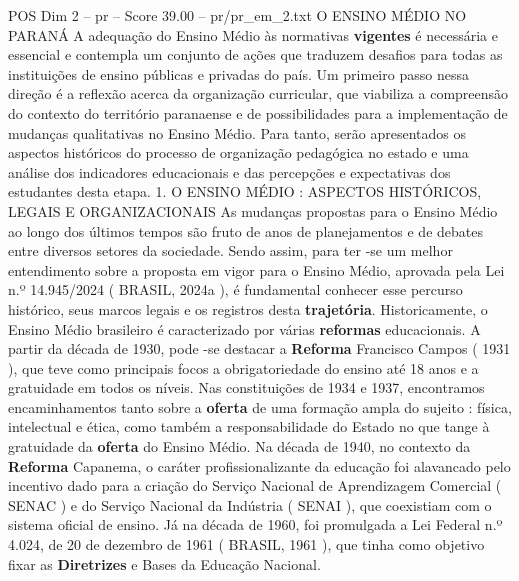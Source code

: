 \begin{textsample}{POS Dim 2 – pr – Score 39.00 – pr/pr\_em\_2.txt}  \label{ex:f2_pos_112}
O ENSINO MÉDIO NO PARANÁ A adequação do Ensino Médio às normativas \textbf{vigentes} é necessária e essencial e contempla um conjunto de ações que traduzem desafios para todas as instituições de ensino públicas e privadas do país.
Um primeiro passo nessa direção é a reflexão acerca da organização curricular, que viabiliza a compreensão do contexto do território paranaense e de possibilidades para a implementação de mudanças qualitativas no Ensino Médio.
Para tanto, serão apresentados os aspectos históricos do processo de organização pedagógica no estado e uma análise dos indicadores educacionais e das percepções e expectativas dos estudantes desta etapa. 1.
O ENSINO MÉDIO : ASPECTOS HISTÓRICOS, LEGAIS E ORGANIZACIONAIS As mudanças propostas para o Ensino Médio ao longo dos últimos tempos são fruto de anos de planejamentos e de debates entre diversos setores da sociedade.
Sendo assim, para ter -se um melhor entendimento sobre a proposta em vigor para o Ensino Médio, aprovada pela Lei n.º 14.945/2024 ( BRASIL, 2024a ), é fundamental conhecer esse percurso histórico, seus marcos legais e os registros desta \textbf{trajetória}.
Historicamente, o Ensino Médio brasileiro é caracterizado por várias \textbf{reformas} educacionais.
A partir da década de 1930, pode -se destacar a \textbf{Reforma} Francisco Campos ( 1931 ), que teve como principais focos a obrigatoriedade do ensino até 18 anos e a gratuidade em todos os níveis.
Nas constituições de 1934 e 1937, encontramos encaminhamentos tanto sobre a \textbf{oferta} de uma formação ampla do sujeito : física, intelectual e ética, como também a responsabilidade do Estado no que tange à gratuidade da \textbf{oferta} do Ensino Médio.
Na década de 1940, no contexto da \textbf{Reforma} Capanema, o caráter profissionalizante da educação foi alavancado pelo incentivo dado para a criação do Serviço Nacional de Aprendizagem Comercial ( SENAC ) e do Serviço Nacional da Indústria ( SENAI ), que coexistiam com o sistema oficial de ensino.
Já na década de 1960, foi promulgada a Lei Federal n.º 4.024, de 20 de dezembro de 1961 ( BRASIL, 1961 ), que tinha como objetivo fixar as \textbf{Diretrizes} e Bases da Educação Nacional.

\end{textsample}
